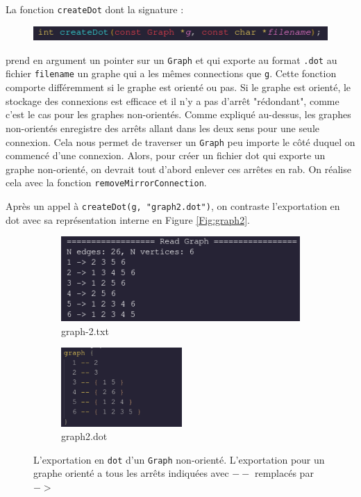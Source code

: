\documentclass[10pt]{article} %
\begin{document}
La fonction \texttt{createDot} dont la signature :
\begin{figure}[h!]
    \centering
    \includegraphics[height=.5cm]{media/createDot.png}
\end{figure}

prend en argument un pointer sur un \texttt{Graph} et qui exporte au format \texttt{.dot} au fichier \texttt{filename} un graphe qui a les mêmes connections
que \texttt{g}. Cette fonction comporte différemment si le graphe est orienté ou pas. Si le graphe est orienté, le stockage des connexions est efficace et il n'y a pas
d'arrêt "rédondant", comme c'est le cas pour les graphes non-orientés. Comme expliqué au-dessus, les graphes non-orientés enregistre des arrêts allant dans les deux
sens pour une seule connexion. Cela nous permet de traverser un \texttt{Graph} peu importe le côté duquel on commencé d'une connexion. Alors, pour créer un fichier
dot qui exporte un graphe non-orienté, on devrait tout d'abord enlever ces arrêtes en rab. On réalise cela avec la fonction \texttt{removeMirrorConnection}.

Après un appel à \texttt{createDot(g, "graph2.dot")}, on contraste l'exportation en dot avec sa représentation interne en Figure \ref{Fig:graph2}.

\begin{figure}[h!]
    \centering
    \begin{subfigure}{0.45\textwidth}
        \centering
        \includegraphics[width=\textwidth]{media/readGraph2.png}
        \caption{graph-2.txt}
    \end{subfigure}
    \hspace{1.25cm}
    \hfill
    \begin{subfigure}{0.45\textwidth}
        \centering
        \includegraphics[height=3cm]{media/graph2_dot.png}
        \caption{graph2.dot}
    \end{subfigure}
    \caption{L'exportation en \texttt{dot} d'un \texttt{Graph} non-orienté. L'exportation pour un graphe orienté a tous les arrêts indiquées avec \texttt{$--$} remplacés par \texttt{$->$}}
    \label{Fig:cmp}

\end{figure}
\end{document}
